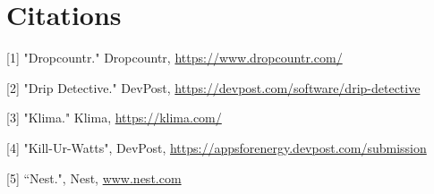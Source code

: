 \documentclass[10pt]{article}
\begin{document}
\clearpage
\section{Citations}
[1] "Dropcountr." Dropcountr, \href{https://www.dropcountr.com/}{https://www.dropcountr.com/}

[2] "Drip Detective." DevPost, \href{https://devpost.com/software/drip-detective}{https://devpost.com/software/drip-detective}

[3] "Klima." Klima, \href{https://klima.com/}{https://klima.com/}

[4] "Kill-Ur-Watts", DevPost, \href{https://appsforenergy.devpost.com/submission}{https://appsforenergy.devpost.com/submission}

[5] “Nest.", Nest, \href{http://www.nest.com}{www.nest.com}
\end{document}
